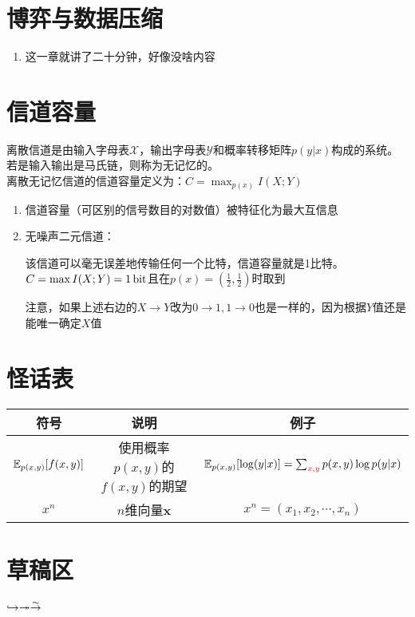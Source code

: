 \documentclass{article}
\begin{document}
\section{博弈与数据压缩}
\begin{enumerate}[label=(\arabic*)]
	\item 这一章就讲了二十分钟，好像没啥内容
\end{enumerate}

\section{信道容量}
\begin{definition}
	离散信道是由输入字母表$\mathcal{X}$，输出字母表$\mathcal{Y}$和概率转移矩阵$p(y|x)$构成的系统。若是输入输出是马氏链，则称为无记忆的。\\
	离散无记忆信道的信道容量定义为：$C=\max_{p(x)}I(X;Y)$
\end{definition}
\begin{enumerate}[label=(\arabic*)]
	\item 信道容量（可区别的信号数目的对数值）被特征化为最大互信息
	\item 无噪声二元信道：
				\begin{figure}[H]
					\centering
				\end{figure}
				该信道可以毫无误差地传输任何一个比特，信道容量就是1比特。$C=\max I(X;Y)=1\operatorname{bit}$且在$p(x)=\left(\frac{1}{2},\frac{1}{2}\right)$时取到
				\begin{remark}
				注意，如果上述右边的$X\to Y$改为$0\to 1,1\to 0$也是一样的，因为根据$Y$值还是能唯一确定$X$值
				\end{remark}
\end{enumerate}

\section{怪话表}
\begin{table}[H]
	\centering
	\renewcommand\arraystretch{1.8}
	\begin{tabular}{ccc}\hline
		符号 & 说明 & 例子\\
		\hline
		$\mathbb{E}_{p(x,y)}[f(x,y)]$ & 使用概率$p(x,y)$的$f(x,y)$的期望 & $\mathbb{E}_{p(x,y)}[\log (y|x)]=\sum_{\color{red} x,y}p(x,y)\log p(y|x)$\\ \hline
		$x^n$ & $n$维向量$\bm{x}$ & $x^n = (x_1,x_2,\cdots ,x_n)$ \\ \hline
	\end{tabular}
\end{table}

\section{草稿区}
$\hookrightarrow \twoheadrightarrow \stackrel{\sim}{\rightarrow}$
\end{document}
